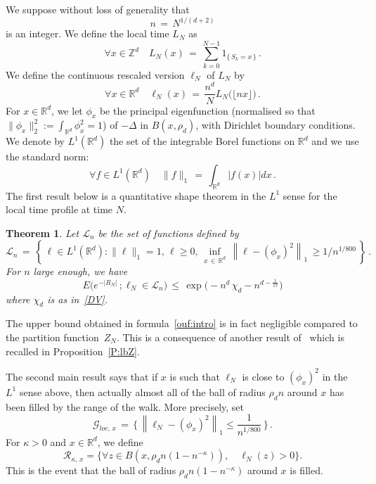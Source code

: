 \documentclass[10pt]{amsart}
\newtheorem{theo}{Theorem}[section]
\theoremstyle{definition}\newtheorem{defi}[theo]{Definition}\newtheorem{rema}[theo]{Remark}\newtheorem{exam}[theo]{Example}\newtheorem{exem}[theo]{Example}\newtheorem{nota}[theo]{Notation}
\newcommand*\Zd {{\mathbb Z^d}}
\newcommand*\Rd {{\mathbb R^d}}
\newcommand*\R{\mathbb{R}}
\newcommand{\cG}{\mathcal{G}}
\newcommand{\cL}{\mathcal{L}}
\newcommand{\cR}{\mathcal{R}}
\let\oldforall\forall
\renewcommand*{\forall}{\mathrel{\oldforall}}
\begin{document}
We suppose without loss of generality that
\[
n\, =\, N^{1/(d+2)}
\]
is an integer. We define the
local time $L_N$ as
\begin{equation*}
\forall x\in\Zd\quad L_N(x)\,=\,
\sum_{k=0}^{N-1}1_{\{\,S_k=x\,\}}\,.
\end{equation*}
We define the continuous rescaled version $\ell_N$ of $L_N$ by
\begin{equation}\label{D:rescaledLN:intro}
\forall x\in\Rd\quad \ell_N(x)\,=\,
\frac{n^d}{N}{L_N\big(\lfloor nx\rfloor\big)}\,.
\end{equation}
For $x \in \R^d$, we let $\phi_x$ be the principal eigenfunction (normalised so that $\|\phi_x\|_2^2 := \int_{\R^d} \phi_x^2 = 1$) of $- \Delta$ in $B(x, \rho_d)$, with Dirichlet boundary conditions. We denote by $L^1(\R^d) $ the set of the integrable Borel functions on $\R^d$ and we use the standard norm:
\[
\forall f \in L^1(\R^d)\quad \|f\|_1\, =\, \int_{\R^d} |f(x)|dx\,.
\]
The first result below is a quantitative shape theorem in the $L^1$ sense for the local time profile at time $N$.


\begin{theo}\label{T:Prop31_intro}
Let $\cL_n$ be the set of functions defined by
\[
\cL_n\,=\,\left\{\,
\ell\in L^1(\Rd): \|\ell\|_1=1,\, \ell\geq 0,\,
\inf_{x\,\in\,\Rd}\,\left\|\ell-(\phi_x)^2\right\|_1\,\geq 1/n^{1/800}\,\right\}\,.
\]
For $n$ large enough, we have
\begin{equation}\label{ouf:intro}
E\big(e^{-|R_N|}\,;
\ell_N\in\cL_n\big)\,\leq\,
\exp\Big(- n^d\,
\chi_d - n^{d-\frac{1}{17}}\Big)
\end{equation}
where $\chi_d$ is as in~\eqref{DV}.
\end{theo}

The upper bound obtained in formula~\eqref{ouf:intro} is in fact negligible compared to the partition function~$Z_N$. This is a consequence of another result of~\cite{BO} which is recalled in Proposition~\ref{P:lbZ}.

The second main result says that if $x$ is such that $\ell_N$ is close to $(\phi_x)^2$ in the $L^1$ sense above, then actually almost all of the ball of radius $\rho_d n$ around $x$ has been filled by the range of the walk. More precisely, set
\[
\cG_{loc,\,x}\,=\,\Big\{\, \left\|\ell_N - (\phi_x)^2 \right\|_1 \le \frac{1}{n^{1/800}}\,\Big\}\,.
\]
For $\kappa>0$ and $x \in \R^d$, we define
\[
\cR_{\kappa,\,x} = \big\{\forall z \in B(x, \rho_d n (1 - n^{- \kappa})),\quad \ell_N(z)>0 \big \}.
\]
This is the event that the ball of radius $\rho_d n (1 - n^{-\kappa})$ around $x$ is filled.
\end{document}
